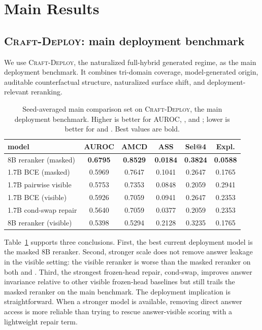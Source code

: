 \section{Main Results}

\subsection{\textsc{Craft-Deploy}: main deployment benchmark}

We use \textsc{Craft-Deploy}, the naturalized full-hybrid generated regime, as
the main deployment benchmark. It combines tri-domain coverage,
model-generated origin, auditable counterfactual structure, naturalized
surface shift, and deployment-relevant reranking.

\begin{table}[t]
\centering
\caption{Seed-averaged main comparison set on \textsc{Craft-Deploy}, the main
deployment benchmark. Higher is better for AUROC, \amcd, and
\selectiongain; lower is better for \asstotal{} and \exploitability. Best
values are bold.}
\label{tab:main}
\small
\begin{tabular}{lccccc}
\toprule
model & AUROC & AMCD & ASS & Sel@4 & Expl. \\
\midrule
8B reranker (masked) & \textbf{0.6795} & \textbf{0.8529} & \textbf{0.0184} & \textbf{0.3824} & \textbf{0.0588} \\
1.7B BCE (masked) & 0.5969 & 0.7647 & 0.1041 & 0.2647 & 0.1765 \\
1.7B pairwise visible & 0.5753 & 0.7353 & 0.0848 & 0.2059 & 0.2941 \\
1.7B BCE (visible) & 0.5926 & 0.7059 & 0.0941 & 0.2647 & 0.2353 \\
1.7B cond-swap repair & 0.5640 & 0.7059 & 0.0377 & 0.2059 & 0.2353 \\
8B reranker (visible) & 0.5398 & 0.5294 & 0.2128 & 0.3235 & 0.1765 \\
\bottomrule
\end{tabular}
\end{table}

Table~\ref{tab:main} supports three conclusions. First, the best current
deployment model is the masked 8B reranker. Second, stronger scale does not
remove answer leakage in the visible setting: the visible reranker is worse
than the masked reranker on both \amcd{} and \asstotal. Third, the strongest
frozen-head repair, cond-swap, improves answer invariance relative to other
visible frozen-head baselines but still trails the masked reranker on the main
benchmark. The deployment implication is straightforward. When a stronger
model is available, removing direct answer access is more reliable than trying
to rescue answer-visible scoring with a lightweight repair term.

